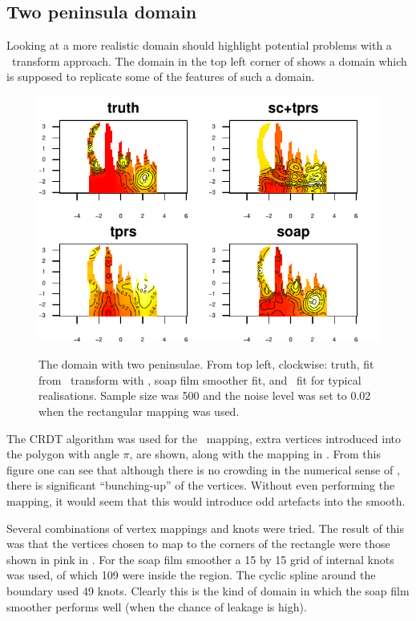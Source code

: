 \subsection{Two peninsula domain}

Looking at a more realistic domain should highlight potential problems with a \sch\ transform approach. The domain in the top left corner of  shows a domain which is supposed to replicate some of the features of such a domain.

\begin{figure}
\centering
\includegraphics[width=6in]{sc/figs/wigglytop2-real.pdf} \\
\caption{The domain with two peninsulae. From top left, clockwise: truth, fit from \sch\ transform with \tprs, soap film smoother fit, and \tprs\ fit for typical realisations. Sample size was 500 and the noise level was set to 0.02 when the rectangular mapping was used.}
\label{sc-wigglytop2-real}
\end{figure}

The CRDT algorithm was used for the \sch\ mapping, extra vertices introduced into the polygon with angle $\pi$, are shown, along with the mapping in . From this figure one can see that although there is no crowding in the numerical sense of \cite{driscoll}, there is significant ``bunching-up'' of the vertices. Without even performing the mapping, it would seem that this would introduce odd artefacts into the smooth.

Several combinations of vertex mappings and knots were tried. The result of this was that the vertices chosen to map to the corners of the rectangle were those shown in pink in . For the soap film smoother a 15 by 15 grid of internal knots was used, of which 109 were inside the region. The cyclic spline around the boundary used 49 knots. Clearly this is the kind of domain in which the soap film smoother performs well (when the chance of leakage is high).

